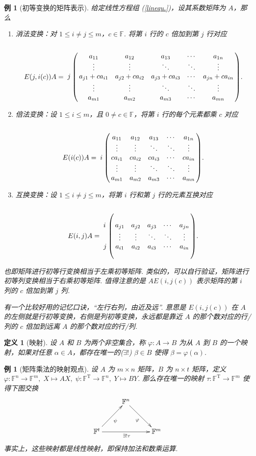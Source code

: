 \documentclass[10pt,openany]{article}
\theoremstyle{thmstyle} %
\theoremstyle{defstyle} %
\newtheorem{definition}[theorem]{定义}
\theoremstyle{prostyle} %
\theoremstyle{exastyle}
\newtheorem{example}[theorem]{例}
\theoremstyle{remstyle}
\newcommand{\T}{^{\text{T}}}
\newcommand{\F}{\mathbb{F}}
\begin{document}
\begin{example}[初等变换的矩阵表示]
	给定线性方程组 (\ref{linequ.})，设其系数矩阵为 \( A \)，那么
	\begin{enumerate}[(1)]
		\item 消法变换：对 \( 1 \leq i \neq j \leq m \)，\( c \in \F \). 将第 \( i \) 行的 \( c \) 倍加到第 \( j \) 行对应
		\[ E(j,i(c))A=\bordermatrix{
			&&&&& \cr
			&a_{11} & a_{12} & a_{13} & \cdots & a_{1n} \cr
			&\vdots & \vdots & \ddots & \ddots & \vdots \cr
			j &a_{j1}+ca_{i1} & a_{j2}+ca_{i2} & a_{j3}+ca_{i3} &  \cdots & a_{jn}+ca_{in} \cr
			&\vdots & \vdots & \ddots & \ddots & \vdots \cr
			&a_{m1} & a_{m2} & a_{m3} & \cdots & a_{mn}
		}. \]
		\item 倍法变换：设 \( 1 \leq i \leq m \)，且 \( 0 \neq c \in \F \)，将第 \( i \) 行的每个元素都乘 \( c \) 对应
		\[ E(i(c))A=\bordermatrix{
			&&&&& \cr
			&a_{11} & a_{12} & a_{13} & \cdots & a_{1n} \cr
			&\vdots & \vdots & \ddots & \ddots & \vdots \cr
			i &ca_{i1} & ca_{i2} & ca_{i3} &  \cdots & ca_{in} \cr
			&\vdots & \vdots & \ddots & \ddots & \vdots \cr
			&a_{m1} & a_{m2} & a_{m3} & \cdots & a_{mn}
		}.  \]
		\item 互换变换：设 \( 1 \leq i \neq j \leq m \)，将第 \( i \) 行和第 \( j \) 行的元素互换对应
		\[ E(i,j)A=\bordermatrix{
			&&&&& \cr
			&&&&& \cr
			i &a_{j1} & a_{j2} & a_{j3} &  \cdots & a_{jn} \cr
			&\vdots & \vdots & \ddots & \ddots & \vdots \cr
			j &a_{i1} & a_{i2} & a_{i3} &  \cdots & a_{in} \cr
			&&&&& 
		}.   \]
	\end{enumerate}
	
	也即矩阵进行初等行变换相当于左乘初等矩阵. 类似的，可以自行验证，矩阵进行初等列变换相当于右乘初等矩阵. 值得注意的是 \( AE(i,j(c)) \) 表示矩阵的第 \( i \) 列的 \( c \) 倍加到第 \( j \) 列. 
	
	有一个比较好用的记忆口诀，“左行右列，由近及远”. 意思是 \( E(i,j(c)) \) 在 \( A \) 的左侧就是行初等变换，右侧是列初等变换，永远都是靠近 \( A \) 的那个数对应的行/列的 \( c \) 倍加到远离 \( A \) 的那个数对应的行/列.
\end{example}

\begin{definition}[映射]
	设 \( A \) 和 \( B \) 为两个非空集合，称 \( \varphi:A \to B \) 为从 \( A \) 到 \( B \) 的一个映射，如果对任意 \( \alpha \in A \)，都存在唯一的(\( \exists !\)) \( \beta \in B \) 使得 \( \beta=\varphi(\alpha) \). 
\end{definition}


\begin{example}[矩阵乘法的映射观点]	\label{1.3.6}
	设 \( A \) 为 \( m \times n \) 矩阵，\( B \) 为 \( n \times t \) 矩阵，定义 \( \varphi: \F^n \to \F^m, \; X \mapsto AX, \; \psi: \F\T \to \F^n, \; Y \mapsto BY \). 那么存在唯一的映射 \( \tau: \F\T \to \F^m \) 使得下图交换
	\[ \xymatrix@R=7ex@C=6ex{
		 & \F^n\ar"2,3"_{\varphi} & \\
		\F^t\ar"1,2"_{\psi}\ar"2,3"_{\exists ! \tau } &  & \F^m\\
	} \]
	事实上，这些映射都是线性映射，即保持加法和数乘运算.

\end{example}
\end{document}
